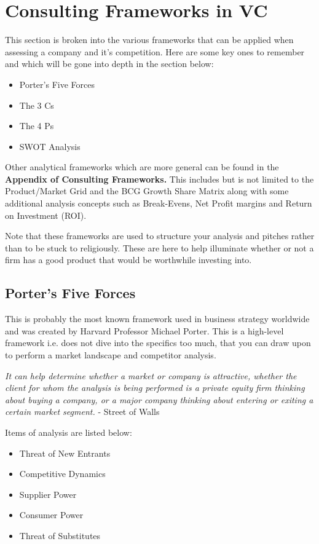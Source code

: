 \documentclass[a4paper]{article}
\begin{document}
{\section{Consulting Frameworks in VC}
This section is broken into the various frameworks that can be applied when assessing a company and it's competition. Here are some key ones to remember and which will be gone into depth in the section below:
\begin{itemize}
	\item Porter's Five Forces
	\item The 3 Cs
	\item The 4 Ps
	\item SWOT Analysis
\end{itemize}
Other analytical frameworks which are more general can be found in the \textbf{Appendix of Consulting Frameworks.} This includes but is not limited to the Product/Market Grid and the BCG Growth Share Matrix along with some additional analysis concepts such as Break-Evens, Net Profit margins and Return on Investment (ROI).

\vspace{5pt}
\noindent Note that these frameworks are used to structure your analysis and pitches rather than to be stuck to religiously. These are here to help illuminate whether or not a firm has a good product that would be worthwhile investing into.

\subsection{Porter's Five Forces}
This is probably the most known framework used in business strategy worldwide and was created by Harvard Professor Michael Porter. This is a high-level framework i.e. does not dive into the specifics too much, that you can draw upon to perform a market landscape and competitor analysis. 

\vspace{5pt}
\noindent \textit{It can help determine whether a market or company is attractive, whether the client for whom the analysis is being performed is a private equity firm thinking about buying a company, or a major company thinking about entering or exiting a certain market segment.} - Street of Walls

\vspace{5pt}
\noindent Items of analysis are listed below:
\begin{itemize}
	\item Threat of New Entrants
	\item Competitive Dynamics
	\item Supplier Power
	\item Consumer Power
	\item Threat of Substitutes
\end{itemize}

}
\end{document}
